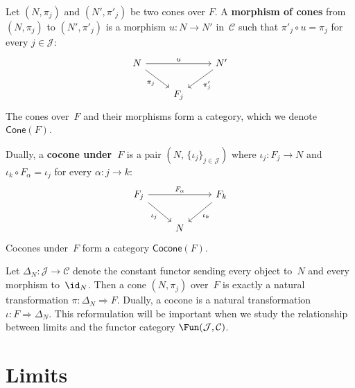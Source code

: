 \begin{definition}\label{def:cone-morphism}
Let $(N,\pi_j)$ and $(N',\pi'_j)$ be two cones over $F$.
A \textbf{morphism of cones} from $(N,\pi_j)$ to $(N',\pi'_j)$
is a morphism $u\colon N\to N'$ in~$\mathcal{C}$ such that
$\pi'_j \circ u = \pi_j$ for every $j\in\mathcal{J}$:
\[
\begin{tikzcd}
N \arrow[rr, "u"] \arrow[dr, "\pi_j"'] && N' \arrow[dl, "\pi'_j"] \\
& F_j &
\end{tikzcd}
\]
The cones over~$F$ and their morphisms form a category,
which we denote $\mathsf{Cone}(F)$.
\end{definition}

\begin{definition}[Cocone]\label{def:cocone}
Dually, a \textbf{cocone under~$F$} is a pair
$(N,\,\{\iota_j\}_{j\in\mathcal{J}})$ where $\iota_j\colon F_j\to N$
and $\iota_k \circ F_\alpha = \iota_j$ for every $\alpha\colon j\to k$:
\[
\begin{tikzcd}
F_j \arrow[rr, "F_\alpha"] \arrow[dr, "\iota_j"'] & & F_k \arrow[dl, "\iota_k"] \\
& N &
\end{tikzcd}
\]
Cocones under~$F$ form a category $\mathsf{Cocone}(F)$.
\end{definition}

\begin{remark}\label{rem:cone-as-nat}
Let $\Delta_N \colon \mathcal{J}\to\mathcal{C}$ denote the constant functor
sending every object to~$N$ and every morphism to~$\id_N$.
Then a cone $(N,\pi_j)$ over~$F$ is exactly a natural transformation
$\pi\colon \Delta_N \Rightarrow F$.
Dually, a cocone is a natural transformation $\iota\colon F\Rightarrow\Delta_N$.
This reformulation will be important when we study the relationship
between limits and the functor category $\Fun(\mathcal{J},\mathcal{C})$.
\end{remark}


\section{Limits}\label{sec:limits}


